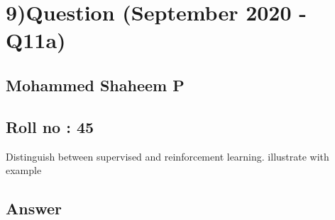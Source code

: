 \section*{9)Question (September 2020 - Q11a)}
    \subsection*{\large Mohammed Shaheem P}
    \subsection*{Roll no : 45}
 Distinguish between supervised and reinforcement learning. illustrate with example

\subsection*{Answer}
